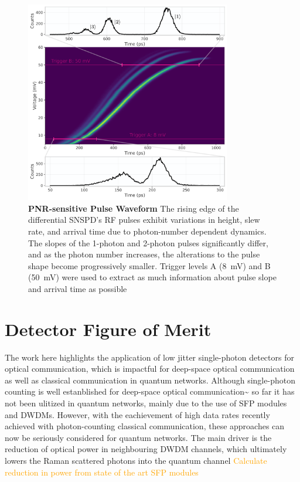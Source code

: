 \documentclass[11pt]{caltech_thesis} %
\begin{document}
\hypertarget{fig:waveform}{%
\begin{figure}
\centering
\includegraphics[width=0.8\textwidth,height=\textheight]{chapter_03/figs_03/waveform_light.pdf}
\caption[{PNR-sensitive Pulse Waveform}]{\textbf{PNR-sensitive Pulse
Waveform} The rising edge of the differential SNSPD's RF pulses exhibit
variations in height, slew rate, and arrival time due to photon-number
dependent dynamics. The slopes of the 1-photon and 2-photon pulses
significantly differ, and as the photon number increases, the
alterations to the pulse shape become progressively smaller. Trigger
levels A (8~mV) and B (50~mV) were used to extract as much information
about pulse slope and arrival time as possible}
\label{fig:waveform}
\end{figure}
}

\hypertarget{detector-figure-of-merit}{%
\section{Detector Figure of Merit}\label{detector-figure-of-merit}}

The work here highlights the application of low jitter single-photon
detectors for optical communication, which is impactful for deep-space
optical communication as well as classical communication in quantum
networks. Although single-photon counting is well estanblished for
deep-space optical
communication\textasciitilde{}\autocite{Srinivasan2023GroundReceiver} so
far it has not been ulitized in quantum networks, mainly due to the use
of SFP modules and DWDMs. However, with the eachievement of high data
rates recently achieved with photon-counting classical communication,
these approaches can now be seriously considered for quantum networks.
The main driver is the reduction of optical power in neighbouring DWDM
channels, which ultimately lowers the Raman scattered photons into the
quantum channel \autocite{EraerdsRaman} \textcolor{orange}{Calculate
reduction in power from state of the art SFP modules}
\end{document}
